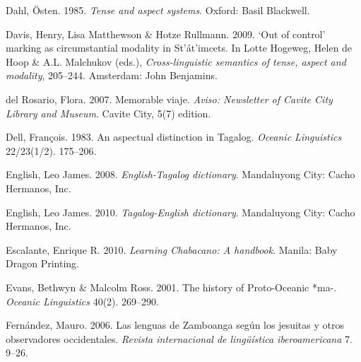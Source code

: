 \begin{styleBibliography}
Dahl, Östen. 1985. \textit{Tense and aspect systems}. Oxford: Basil Blackwell.
\end{styleBibliography}

\begin{styleBibliography}
Davis, Henry, Lisa Matthewson \& Hotze Rullmann. 2009. ‘Out of control’ marking as circumstantial modality in St’át’imcets. In Lotte Hogeweg, Helen de Hoop \& A.L. Malchukov (eds.), \textit{Cross-linguistic semantics of tense, aspect and modality}, 205–244. Amsterdam: John Benjamins.
\end{styleBibliography}

\begin{styleBibliography}
del Rosario, Flora. 2007. Memorable viaje. \textit{Aviso: Newsletter of Cavite City Library and Museum}. Cavite City, 5(7) edition.
\end{styleBibliography}

\begin{styleBibliography}
Dell, François. 1983. An aspectual distinction in Tagalog. \textit{Oceanic Linguistics} 22/23(1/2). 175–206.
\end{styleBibliography}

\begin{styleBibliography}
English, Leo James. 2008. \textit{English-Tagalog dictionary}. Mandaluyong City: Cacho Hermanos, Inc.
\end{styleBibliography}

\begin{styleBibliography}
English, Leo James. 2010. \textit{Tagalog-English dictionary}. Mandaluyong City: Cacho Hermanos, Inc.
\end{styleBibliography}

\begin{styleBibliography}
Escalante, Enrique R. 2010. \textit{Learning Chabacano: A handbook}. Manila: Baby Dragon Printing.
\end{styleBibliography}

\begin{styleBibliography}
Evans, Bethwyn \& Malcolm Ross. 2001. The history of Proto-Oceanic *ma-. \textit{Oceanic Linguistics} 40(2). 269–290.
\end{styleBibliography}

\begin{styleBibliography}
Fernández, Mauro. 2006. Las lenguas de Zamboanga según los jesuitas y otros observadores occidentales. \textit{Revista internacional de lingüística iberoamericana} 7. 9–26.
\end{styleBibliography}

